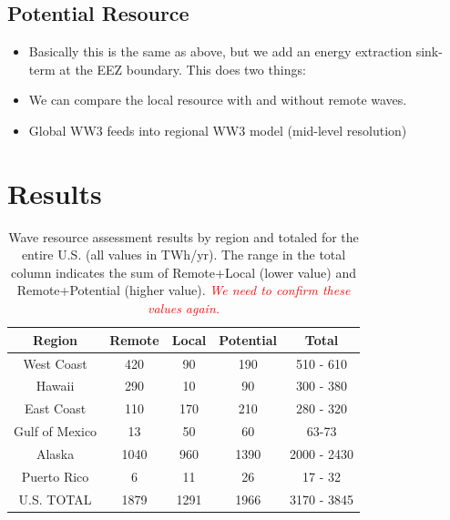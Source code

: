 \documentclass[authoryear,preprint]{elsarticle}
\newcommand{\note}[1]{\textcolor{red}{\em #1}}
\begin{document}
\subsection{Potential Resource}

\begin{itemize}
\item Basically this is the same as above, but we add an energy extraction sink-term at the EEZ boundary. This does two things:
\item We can compare the local resource with and without remote waves.
\item Global WW3 feeds into regional WW3 model (mid-level resolution)
\end{itemize}


\section{Results}

\begin{table}[ht]
  \centering
  \begin{tabular}{|c|c|c|c|c|}
    \hline
    Region & Remote & Local & Potential & Total \\
    \hline
    West Coast & 420 & 90 & 190 & 510 - 610 \\
    Hawaii & 290 & 10 & 90 & 300 - 380 \\
    East Coast & 110 & 170 & 210 & 280 - 320 \\
    Gulf of Mexico & 13 & 50 & 60 & 63-73 \\
    Alaska & 1040 & 960 & 1390 & 2000 - 2430 \\
    Puerto Rico & 6 & 11 & 26 & 17 - 32 \\
    \hline \hline
U.S. TOTAL & 1879 & 1291 & 1966 & 3170 - 3845 \\
\hline
  \end{tabular}
  \caption{Wave resource assessment results by region and totaled for the entire U.S. (all values in TWh/yr). The range in the total column indicates the sum of Remote+Local (lower value) and Remote+Potential (higher value). \note{We need to confirm these values again.}}
  \label{table:totals}
\end{table}
\end{document}
